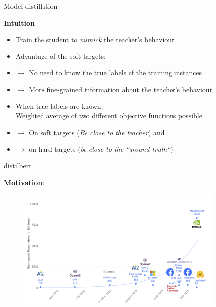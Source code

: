 
\begin{frame}{Model distillation}

\vfill

\textbf{Intuition}

\begin{itemize}
	\item Train the student to \textit{mimick} the teacher's behaviour
	\item \ques Advantage of the soft targets:
	\item[] $\to$ No need to know the true labels of the training instances
	\item[] $\to$ More fine-grained information about the teacher's behaviour 
	\item When true labels are known:\\
				Weighted average of two different objective functions possible\\
	\item[] $\to$ On soft targets (\textit{Be close to the teacher}) and 
	\item[] $\to$ on hard targets (\textit{be close to the ``ground truth``})
\end{itemize}

\vfill

\end{frame}


\begin{frame}{distilbert}

\textbf{Motivation:}
	\begin{figure}
		\centering
		\includegraphics[width = 10cm]{figure/distilbert-motivation}\\ 
	\end{figure}
	
\end{frame}

